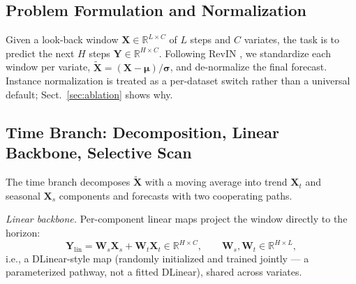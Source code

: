 \documentclass[runningheads]{llncs}
\begin{document}
\subsection{Problem Formulation and Normalization}

Given a look-back window $\mathbf{X} \in \mathbb{R}^{L \times C}$ of $L$
steps and $C$ variates, the task is to predict the next $H$ steps
$\mathbf{Y} \in \mathbb{R}^{H \times C}$. Following RevIN \cite{revin}, we
standardize each window per variate, $\tilde{\mathbf{X}} = (\mathbf{X} -
\boldsymbol{\mu}) / \boldsymbol{\sigma}$, and de-normalize the final
forecast. Instance normalization is treated as a per-dataset switch rather
than a universal default; Sect.~\ref{sec:ablation} shows why.

\subsection{Time Branch: Decomposition, Linear Backbone, Selective Scan}
\label{sec:anchors}

The time branch decomposes $\tilde{\mathbf{X}}$ with a moving average into
trend $\mathbf{X}_t$ and seasonal $\mathbf{X}_s$ components
\cite{autoformer,dlinear} and forecasts with two cooperating paths.

\emph{Linear backbone.} Per-component linear maps project the window
directly to the horizon:
\begin{equation}
\mathbf{Y}_{\mathrm{lin}} = \mathbf{W}_s \mathbf{X}_s +
\mathbf{W}_t \mathbf{X}_t \in \mathbb{R}^{H \times C},
\qquad \mathbf{W}_s, \mathbf{W}_t \in \mathbb{R}^{H \times L},
\end{equation}
i.e., a DLinear-style map \cite{dlinear} (randomly initialized and
trained jointly --- a parameterized pathway, not a fitted DLinear),
shared across variates.
\end{document}
